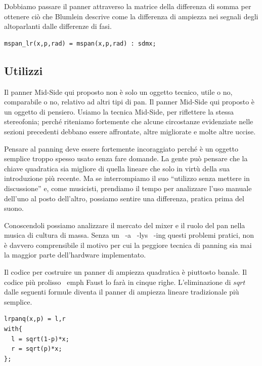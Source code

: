 Dobbiamo passare il panner attraverso la matrice della differenza di somma per
ottenere ciò che Blumlein descrive come la differenza di ampiezza nei segnali
degli altoparlanti dalle differenze di fasi.

\begin{lstlisting}
mspan_lr(x,p,rad) = mspan(x,p,rad) : sdmx;
\end{lstlisting}

\subsection{Utilizzi}

Il panner Mid-Side qui proposto non è solo un oggetto tecnico, utile o no,
comparabile o no, relativo ad altri tipi di pan. Il panner Mid-Side qui proposto
è un oggetto di pensiero. Usiamo la tecnica Mid-Side, per riflettere la stessa
stereofonia; perché riteniamo fortemente che alcune circostanze evidenziate
nelle sezioni precedenti debbano essere affrontate, altre migliorate e molte
altre uccise.

Pensare al panning deve essere fortemente incoraggiato perché è un oggetto
semplice troppo spesso usato senza fare domande. La gente può pensare che la
chiave quadratica sia migliore di quella lineare che solo in virtù della sua
introduzione più recente. Ma se interrompiamo il suo “utilizzo senza mettere in
discussione” e, come musicisti, prendiamo il tempo per analizzare l'uso manuale
dell'uno al posto dell'altro, possiamo sentire una differenza, pratica prima del
suono.

Conoscendoli possiamo analizzare il mercato del mixer e il ruolo del pan nella
musica di cultura di massa. Senza un \ -a \ -lys \ -ing questi problemi pratici,
non è davvero comprensibile il motivo per cui la peggiore tecnica di panning sia
mai la maggior parte dell'hardware implementato.

Il codice per costruire un panner di ampiezza quadratica è piuttosto banale.
Il codice più prolisso \ emph {Faust} lo farà in cinque righe. L'eliminazione di
$sqrt$ dalle seguenti formule diventa il panner di ampiezza lineare tradizionale
più semplice.

\begin{lstlisting}
lrpanq(x,p) = l,r
with{
  l = sqrt(1-p)*x;
  r = sqrt(p)*x;
};
\end{lstlisting}

